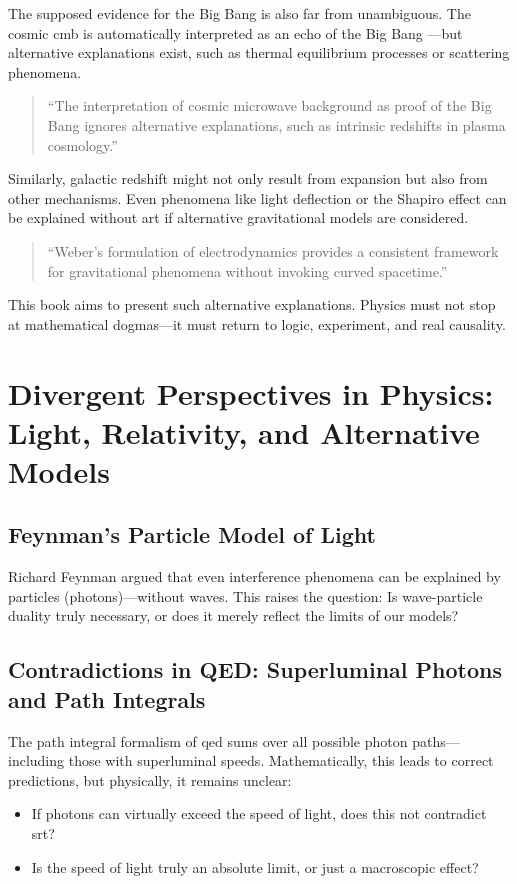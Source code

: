 The supposed evidence for the Big Bang is also far from unambiguous. The cosmic \gls{cmb} is automatically interpreted as an echo of the Big Bang
—but alternative explanations exist, such as thermal equilibrium processes or scattering phenomena.
\begin{quote}
    \enquote{The interpretation of cosmic microwave background as proof of the Big Bang ignores alternative explanations, such as intrinsic redshifts in plasma cosmology.} \cite{Arp1998}
\end{quote}
Similarly, galactic redshift might not only result from expansion but also from other mechanisms. Even phenomena like light deflection or the
Shapiro effect can be explained without \gls{art} if alternative gravitational models are considered.
\begin{quote}
    \enquote{Weber's formulation of electrodynamics provides a consistent framework for gravitational phenomena without invoking curved spacetime.} \cite{WeberElectrodynamics}
\end{quote}
This book aims to present such alternative explanations. Physics must not stop at mathematical dogmas—it must return to logic, experiment, and
real causality.

\section{Divergent Perspectives in Physics: Light, Relativity, and Alternative Models}
\subsection{Feynman's Particle Model of Light}
Richard Feynman argued that even interference phenomena can be explained by particles (photons)—without waves. This raises the question: Is wave-particle duality truly
necessary, or does it merely reflect the limits of our models?

\subsection{Contradictions in QED: Superluminal Photons and Path Integrals}
The path integral formalism of \gls{qed} sums over all possible photon paths—including those with superluminal speeds. Mathematically, this leads to correct predictions,
but physically, it remains unclear:
\begin{itemize}
    \item If photons can virtually exceed the speed of light, does this not contradict \gls{srt}?
    \item Is the speed of light truly an absolute limit, or just a macroscopic effect?
\end{itemize}

